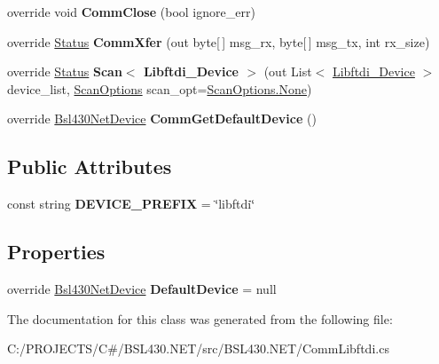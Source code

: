 \begin{DoxyCompactItemize}
override void {\bfseries Comm\+Close} (bool ignore\+\_\+err)
\item 
\mbox{\label{class_b_s_l430___n_e_t_1_1_comm_1_1_comm_libftdi_ac162e16141f6375270cdcee61c347762}} 
override \mbox{\hyperlink{class_b_s_l430___n_e_t_1_1_status}{Status}} {\bfseries Comm\+Xfer} (out byte\mbox{[}$\,$\mbox{]} msg\+\_\+rx, byte\mbox{[}$\,$\mbox{]} msg\+\_\+tx, int rx\+\_\+size)
\item 
\mbox{\label{class_b_s_l430___n_e_t_1_1_comm_1_1_comm_libftdi_a64e797fc1001a3c114809d02ed6eab61}} 
override \mbox{\hyperlink{class_b_s_l430___n_e_t_1_1_status}{Status}} {\bfseries Scan$<$ Libftdi\+\_\+\+Device $>$} (out List$<$ \mbox{\hyperlink{class_b_s_l430___n_e_t_1_1_comm_1_1_libftdi___device}{Libftdi\+\_\+\+Device}} $>$ device\+\_\+list, \mbox{\hyperlink{namespace_b_s_l430___n_e_t_a4cd6f8166a2a97ccb3405df2287d4ba8}{Scan\+Options}} scan\+\_\+opt=\mbox{\hyperlink{namespace_b_s_l430___n_e_t_a4cd6f8166a2a97ccb3405df2287d4ba8a6adf97f83acf6453d4a6a4b1070f3754}{Scan\+Options.\+None}})
\item 
\mbox{\label{class_b_s_l430___n_e_t_1_1_comm_1_1_comm_libftdi_ada174f1ad4115190b0c717715ece2ea2}} 
override \mbox{\hyperlink{class_b_s_l430___n_e_t_1_1_bsl430_net_device}{Bsl430\+Net\+Device}} {\bfseries Comm\+Get\+Default\+Device} ()
\end{DoxyCompactItemize}
\subsection*{Public Attributes}
\begin{DoxyCompactItemize}
\item 
\mbox{\label{class_b_s_l430___n_e_t_1_1_comm_1_1_comm_libftdi_ad95f97be4d545e6875ce648895cc775e}} 
const string {\bfseries D\+E\+V\+I\+C\+E\+\_\+\+P\+R\+E\+F\+IX} = \char`\"{}libftdi\char`\"{}
\end{DoxyCompactItemize}
\subsection*{Properties}
\begin{DoxyCompactItemize}
\item 
\mbox{\label{class_b_s_l430___n_e_t_1_1_comm_1_1_comm_libftdi_a17912ba810d846498cb215bd93dc76d6}} 
override \mbox{\hyperlink{class_b_s_l430___n_e_t_1_1_bsl430_net_device}{Bsl430\+Net\+Device}} {\bfseries Default\+Device} = null
\end{DoxyCompactItemize}


The documentation for this class was generated from the following file\+:\begin{DoxyCompactItemize}
\item 
C\+:/\+P\+R\+O\+J\+E\+C\+T\+S/\+C\#/\+B\+S\+L430.\+N\+E\+T/src/\+B\+S\+L430.\+N\+E\+T/Comm\+Libftdi.\+cs\end{DoxyCompactItemize}
